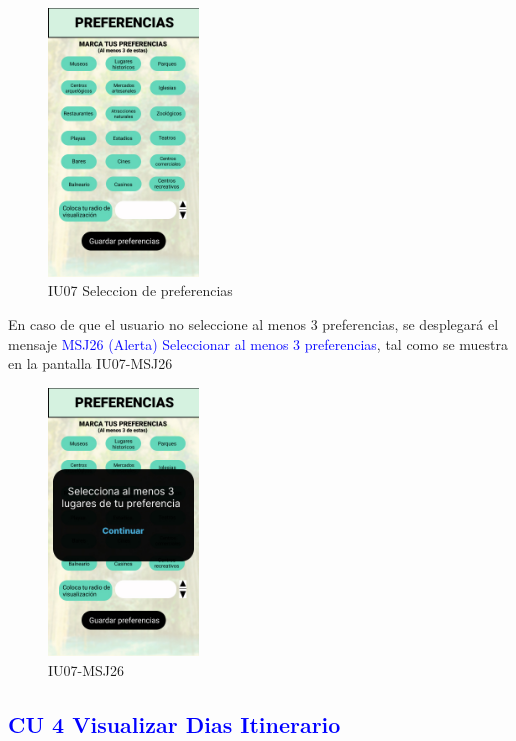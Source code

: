     \begin{figure}[htb]
        \centering
        \includegraphics[width= 4cm]{Pantallas Prototipo3/IU07-Preferencias del usuario.jpg}
        \caption{IU07 Seleccion de preferencias}
        \label{fig:enter-label}
    \end{figure}

En caso de que el usuario no seleccione al menos 3 preferencias, se desplegará el mensaje {\textcolor{blue}{MSJ26 (Alerta) Seleccionar al menos 3 preferencias}}, tal como se muestra en la pantalla IU07-MSJ26
\newpage
    \begin{figure}[h]
        \centering
        \includegraphics[width= 4cm]{Pantallas Prototipo3/IU07-MSJ26 -Seleccionar al menos 3.jpg}
        \caption{IU07-MSJ26}
        \label{fig:enter-label}
    \end{figure}
    

\pagebreak
\subsection{\textcolor{blue}{CU 4 Visualizar Dias Itinerario}}

